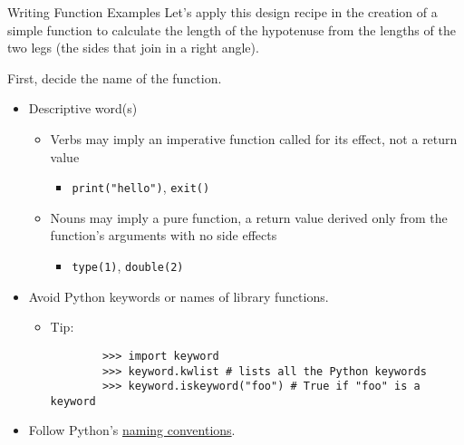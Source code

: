 \documentclass[smaller, aspectratio=1610]{beamer}
\begin{document}
\begin{frame}[label={sec:org922e455},fragile]{Writing Function Examples}
 Let's apply this design recipe in the creation of a simple function to calculate the length of the hypotenuse from the lengths of the two legs (the sides that join in a right angle).

First, decide the name of the function.

\begin{itemize}
\item Descriptive word(s)
\begin{itemize}
\item Verbs may imply an imperative function called for its effect, not a return value
\begin{itemize}
\item \texttt{print("hello")}, \texttt{exit()}
\end{itemize}
\item Nouns may imply a pure function, a return value derived only from the function's arguments with no side effects
\begin{itemize}
\item \texttt{type(1)}, \texttt{double(2)}
\end{itemize}
\end{itemize}

\item Avoid Python keywords or names of library functions.
\begin{itemize}
\item Tip:

\lstset{language=Python,label= ,caption= ,captionpos=b,numbers=none}
\begin{lstlisting}
        >>> import keyword
        >>> keyword.kwlist # lists all the Python keywords
        >>> keyword.iskeyword("foo") # True if "foo" is a keyword
\end{lstlisting}
\end{itemize}

\item Follow Python's \href{https://www.python.org/dev/peps/pep-0008/}{naming conventions}.
\end{itemize}
\end{frame}
\end{document}
